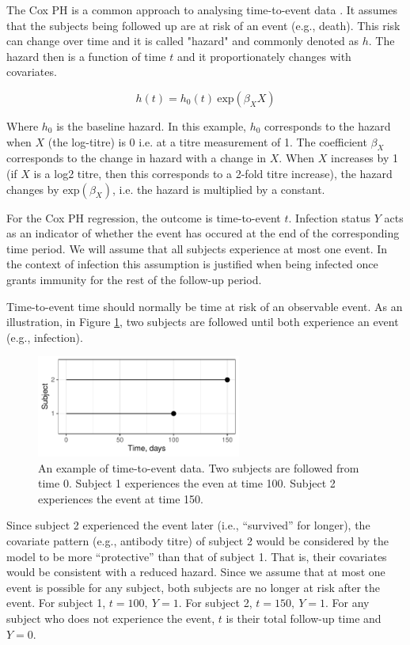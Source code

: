 The Cox PH is a common approach to analysing time-to-event data \cite{George;2014}. It assumes that the subjects being followed up are at risk of an event (e.g., death). This risk can change over time and it is called "hazard" and commonly denoted as $h$. The hazard then is a function of time $t$ and it proportionately changes with covariates.

$$
h(t) = h_0(t) \ \text{exp}(\beta_XX)
$$

Where $h_0$ is the baseline hazard. In this example, $h_0$ corresponds to the hazard when $X$ (the log-titre) is 0 i.e. at a titre measurement of 1. The coefficient $\beta_X$ corresponds to the change in hazard with a change in $X$. When $X$ increases by 1 (if $X$ is a log2 titre, then this corresponds to a 2-fold titre increase), the hazard changes by $\text{exp}(\beta_X)$, i.e. the hazard is multiplied by a constant.

For the Cox PH regression, the outcome is time-to-event $t$. Infection status $Y$ acts as an indicator of whether the event has occured at the end of the corresponding time period. We will assume that all subjects experience at most one event. In the context of infection this assumption is justified when being infected once grants immunity for the rest of the follow-up period.

Time-to-event time should normally be time at risk of an observable event. As an illustration, in Figure \ref{CoxExampleFull}, two subjects are followed until both experience an event (e.g., infection).

\begin{figure}[htp]
	\centering
	\includegraphics[width=0.6\textwidth]{../curve-cox/timeplot_1_light.pdf}
	\caption{
	An example of time-to-event data. Two subjects are followed from time 0. Subject 1 experiences the even at time 100. Subject 2 experiences the event at time 150.
	}
	\label{CoxExampleFull}
\end{figure}

Since subject 2 experienced the event later (i.e., ``survived'' for longer), the covariate pattern (e.g., antibody titre) of subject 2 would be considered by the model to be more ``protective'' than that of subject 1. That is, their covariates would be consistent with a reduced hazard. Since we assume that at most one event is possible for any subject, both subjects are no longer at risk after the event. For subject 1, $t=100,\ Y=1$. For subject 2, $t=150,\ Y=1$. For any subject who does not experience the event, $t$ is their total follow-up time and $Y=0$.

